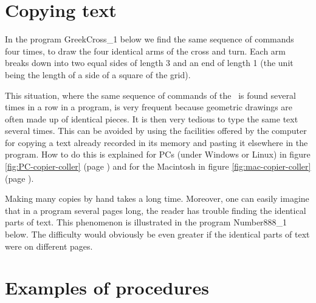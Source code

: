 \section{Copying text}

In the program {\idt GreekCross\_1} below we find the same
sequence of commands four times, to draw the four
iden\-ti\-cal arms of the cross and turn. Each arm breaks down into two equal sides
of length 3 and an end of length 1 (the unit
being the length of a side of a square of the grid).

\vspace{\baselineskip}
\vspace*{3cm}%
\vspace*{-3cm}%
\label{prog:CroixGrecque_1}


This situation, where the same sequence of commands of the \robot\ is found
several times in a row in a program, is very frequent because
geometric drawings are often made up of identical pieces. It is then
very tedious to type the same text several times. This can be avoided
by using the facilities offered by the computer for copying a text
already recorded in its memory and pasting it elsewhere in the
program. How to do this is explained for
PCs (under Windows or Linux) in figure \ref{fig:PC-copier-coller}
(page \pageref{fig:PC-copier-coller})
and for the Macintosh in figure \ref{fig:mac-copier-coller}
(page \pageref{fig:mac-copier-coller}).



Making many copies by hand takes a long time. Moreover, one can easily imagine that
in a program several pages long, the reader has trouble finding the
identical parts of text. This phenomenon is illustrated in the
program {\idt Number888\_1} below. The difficulty would
obviously be even greater if the identical parts of text were
on different pages.

\vspace{\baselineskip}
\vspace*{2cm}%
\vspace*{-2cm}%


\section{Examples of procedures}

